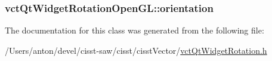 \subsubsection[{orientation}]{ vct\+Qt\+Widget\+Rotation\+Open\+G\+L\+::orientation\hspace{0.3cm}{\ttfamily [protected]}}\label{classvct_qt_widget_rotation_open_g_l_ae9fd2c827d38e62e475257ce91261e20}


The documentation for this class was generated from the following file\+:\begin{DoxyCompactItemize}
\item 
/\+Users/anton/devel/cisst-\/saw/cisst/cisst\+Vector/\hyperlink{vct_qt_widget_rotation_8h}{vct\+Qt\+Widget\+Rotation.\+h}\end{DoxyCompactItemize}
